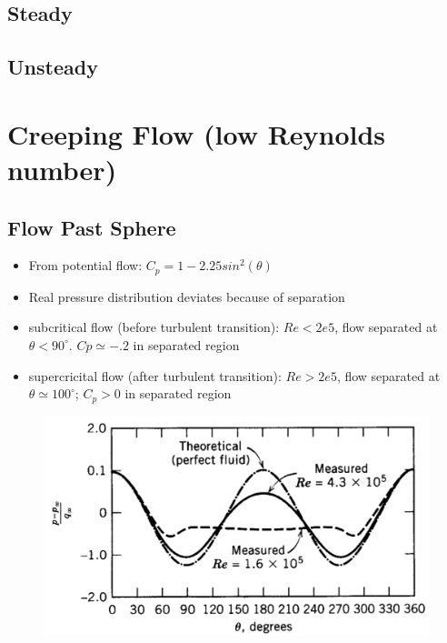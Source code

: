 \documentclass[a4paper]{article}
\begin{document}
    \subsection{Steady}
    \subsection{Unsteady}   

\section{Creeping Flow (low Reynolds number)}

    \subsection{Flow Past Sphere}
    \begin{itemize}
        \item From potential flow: $C_p = 1 - 2.25 sin^2(\theta)$
        \item Real pressure distribution deviates because of separation
        \item subcritical flow (before turbulent transition): $Re < 2e5$, flow separated at $\theta < 90^\circ$. $Cp \simeq -.2$ in separated region
        \item supercricital flow (after turbulent transition): $Re > 2e5$, flow separated at $\theta \simeq 100^\circ$; $C_p > 0$ in separated region
    \end{itemize}
    \begin{figure}[H]
        \centering
        \includegraphics[width=.75\textwidth]{images/pressure_about_sphere.png}
    \end{figure}
\end{document}

